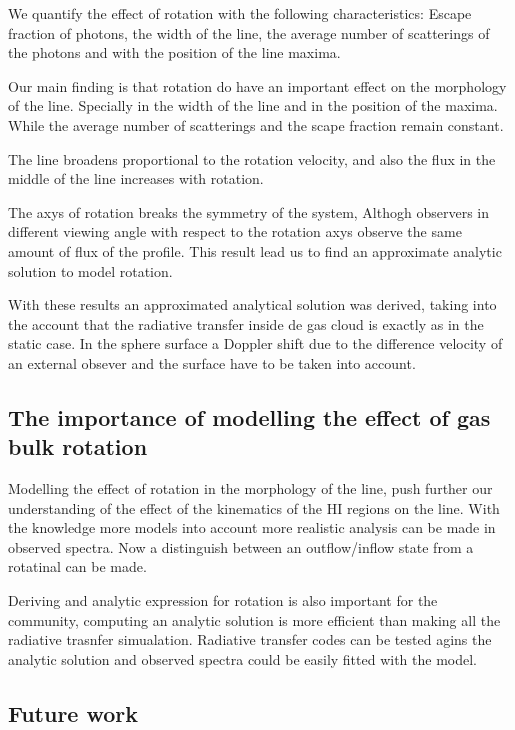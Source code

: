 We quantify the effect of rotation with the following characteristics: 
Escape fraction of \ly photons, the width of the \ly line, the average number
of scatterings of the \ly photons and with the position of the \ly line maxima.

Our main finding is that rotation do have an important effect on the morphology 
of the \ly line. Specially in the width of the line and in the position of the 
maxima. While the average number of scatterings  and the scape
fraction remain constant.

The line broadens proportional to the rotation velocity, and also the flux in 
the middle of the line increases with rotation.

The axys of rotation breaks the symmetry of the system, Althogh 
observers in different viewing angle with respect to the rotation axys
observe the same amount of flux of the \ly profile. This result
lead us to find an approximate analytic solution to model rotation.
 
 
With these results an approximated analytical solution was derived, 
taking into the account that the radiative transfer inside de gas
cloud is exactly as in the static case. In the sphere surface
a Doppler shift due to the difference velocity of an external 
obsever and the surface have to be taken into account.  


\subsection{The importance of modelling the effect of gas bulk rotation}

Modelling the effect of rotation in the morphology of the \ly line, push 
further our understanding of the effect of the kinematics of the HI regions
on the line. With the knowledge more models into account more realistic analysis 
can be made in observed \ly spectra. Now a distinguish between an 
outflow/inflow state from a rotatinal can be made.  

Deriving and analytic expression for rotation is also important for 
the community, computing an analytic solution is more efficient than 
making all the radiative trasnfer simualation. Radiative transfer codes 
can be tested agins the analytic solution and observed spectra could 
be easily fitted  with the model. 

\subsection{Future work}

